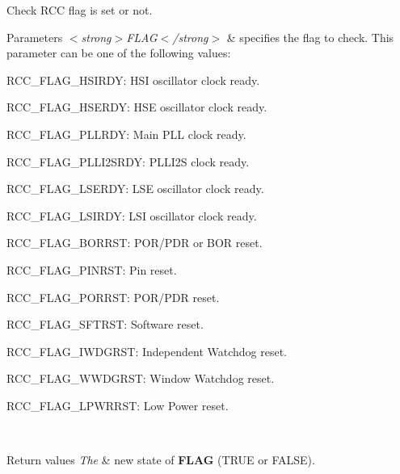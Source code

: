 Check R\+CC flag is set or not. 


\begin{DoxyParams}{Parameters}
{\em $<$strong$>$\+F\+L\+A\+G$<$/strong$>$} & specifies the flag to check. This parameter can be one of the following values\+: \begin{DoxyItemize}
\item R\+C\+C\+\_\+\+F\+L\+A\+G\+\_\+\+H\+S\+I\+R\+DY\+: H\+SI oscillator clock ready. \item R\+C\+C\+\_\+\+F\+L\+A\+G\+\_\+\+H\+S\+E\+R\+DY\+: H\+SE oscillator clock ready. \item R\+C\+C\+\_\+\+F\+L\+A\+G\+\_\+\+P\+L\+L\+R\+DY\+: Main P\+LL clock ready. \item R\+C\+C\+\_\+\+F\+L\+A\+G\+\_\+\+P\+L\+L\+I2\+S\+R\+DY\+: P\+L\+L\+I2S clock ready. \item R\+C\+C\+\_\+\+F\+L\+A\+G\+\_\+\+L\+S\+E\+R\+DY\+: L\+SE oscillator clock ready. \item R\+C\+C\+\_\+\+F\+L\+A\+G\+\_\+\+L\+S\+I\+R\+DY\+: L\+SI oscillator clock ready. \item R\+C\+C\+\_\+\+F\+L\+A\+G\+\_\+\+B\+O\+R\+R\+ST\+: P\+O\+R/\+P\+DR or B\+OR reset. \item R\+C\+C\+\_\+\+F\+L\+A\+G\+\_\+\+P\+I\+N\+R\+ST\+: Pin reset. \item R\+C\+C\+\_\+\+F\+L\+A\+G\+\_\+\+P\+O\+R\+R\+ST\+: P\+O\+R/\+P\+DR reset. \item R\+C\+C\+\_\+\+F\+L\+A\+G\+\_\+\+S\+F\+T\+R\+ST\+: Software reset. \item R\+C\+C\+\_\+\+F\+L\+A\+G\+\_\+\+I\+W\+D\+G\+R\+ST\+: Independent Watchdog reset. \item R\+C\+C\+\_\+\+F\+L\+A\+G\+\_\+\+W\+W\+D\+G\+R\+ST\+: Window Watchdog reset. \item R\+C\+C\+\_\+\+F\+L\+A\+G\+\_\+\+L\+P\+W\+R\+R\+ST\+: Low Power reset. \end{DoxyItemize}
\\
\hline
\end{DoxyParams}

\begin{DoxyRetVals}{Return values}
{\em The} & new state of {\bfseries F\+L\+AG} (T\+R\+UE or F\+A\+L\+SE). \\
\hline
\end{DoxyRetVals}

